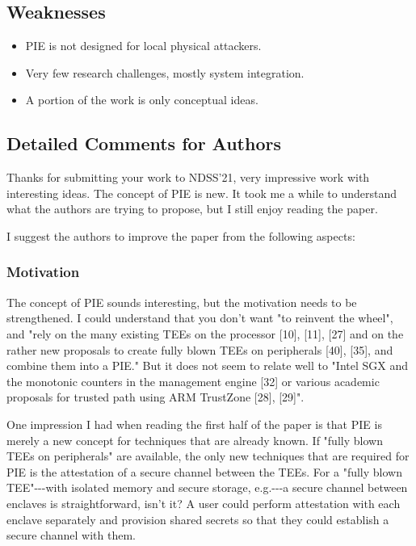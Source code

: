 \documentclass[9pt]{article}
\begin{document}
\subsection{Weaknesses}

\begin{itemize}
\item
  PIE is not designed for local physical attackers.
\item
  Very few research challenges, mostly system integration.
\item
  A portion of the work is only conceptual ideas.
\end{itemize}

\subsection{Detailed Comments for Authors}

Thanks for submitting your work to NDSS'21, very impressive work with
interesting ideas. The concept of PIE is new. It took me a while to
understand what the authors are trying to propose, but I still enjoy
reading the paper.

I suggest the authors to improve the paper from the following aspects:

\subsubsection{Motivation}

The concept of PIE sounds interesting, but the motivation needs to be
strengthened. I could understand that you don't want "to reinvent the
wheel", and "rely on the many existing TEEs on the processor {[}10{]},
{[}11{]}, {[}27{]} and on the rather new proposals to create fully blown
TEEs on peripherals {[}40{]}, {[}35{]}, and combine them into a PIE."
But it does not seem to relate well to "Intel SGX and the monotonic
counters in the management engine {[}32{]} or various academic proposals
for trusted path using ARM TrustZone {[}28{]}, {[}29{]}".

One impression I had when reading the first half of the paper is that
PIE is merely a new concept for techniques that are already known. If
"fully blown TEEs on peripherals" are available, the only new techniques
that are required for PIE is the attestation of a secure channel between
the TEEs. For a "fully blown TEE"-\/-\/-with isolated memory and secure
storage, e.g.-\/-\/-a secure channel between enclaves is
straightforward, isn't it? A user could perform attestation with each
enclave separately and provision shared secrets so that they could
establish a secure channel with them.
\end{document}
